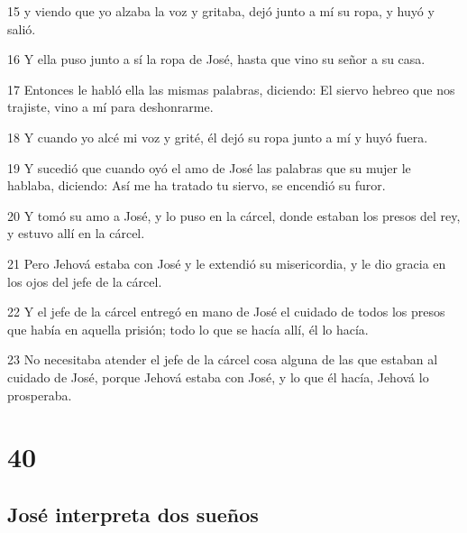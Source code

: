 \par 15 y viendo que yo alzaba la voz y gritaba, dejó junto a mí su ropa, y huyó y salió.
\par 16 Y ella puso junto a sí la ropa de José, hasta que vino su señor a su casa.
\par 17 Entonces le habló ella las mismas palabras, diciendo: El siervo hebreo que nos trajiste, vino a mí para deshonrarme.
\par 18 Y cuando yo alcé mi voz y grité, él dejó su ropa junto a mí y huyó fuera.
\par 19 Y sucedió que cuando oyó el amo de José las palabras que su mujer le hablaba, diciendo: Así me ha tratado tu siervo, se encendió su furor.
\par 20 Y tomó su amo a José, y lo puso en la cárcel, donde estaban los presos del rey, y estuvo allí en la cárcel.
\par 21 Pero Jehová estaba con José y le extendió su misericordia, y le dio gracia en los ojos del jefe de la cárcel.
\par 22 Y el jefe de la cárcel entregó en mano de José el cuidado de todos los presos que había en aquella prisión; todo lo que se hacía allí, él lo hacía.
\par 23 No necesitaba atender el jefe de la cárcel cosa alguna de las que estaban al cuidado de José, porque Jehová estaba con José, y lo que él hacía, Jehová lo prosperaba.

\chapter{40}

\section*{José interpreta dos sueños}

